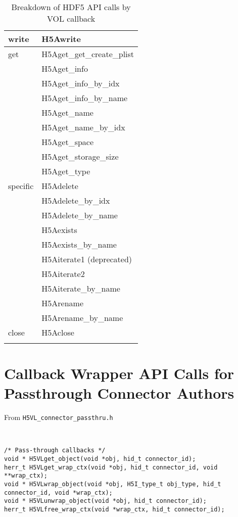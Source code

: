 \begin{appendices}
\begin{longtable}{ |l|>{\raggedright\arraybackslash}l| }
    \hline
    write & H5Awrite \\
    \hline
    get & H5Aget\_get\_create\_plist \\
        & H5Aget\_info \\
        & H5Aget\_info\_by\_idx \\
        & H5Aget\_info\_by\_name \\
        & H5Aget\_name \\
        & H5Aget\_name\_by\_idx \\
        & H5Aget\_space \\
        & H5Aget\_storage\_size \\
        & H5Aget\_type \\
    \hline
    specific & H5Adelete \\
             & H5Adelete\_by\_idx \\
             & H5Adelete\_by\_name \\
             & H5Aexists \\
             & H5Aexists\_by\_name \\
             & H5Aiterate1 (deprecated) \\
             & H5Aiterate2 \\
             & H5Aiterate\_by\_name \\
             & H5Arename \\
             & H5Arename\_by\_name \\
    \hline
    close & H5Aclose \\
    \hline
\caption{Breakdown of HDF5 API calls by VOL callback}
\end{longtable}

\pagebreak

\section{Callback Wrapper API Calls for Passthrough Connector Authors}
\label{sec:B}

From {\tt H5VL\_connector\_passthru.h}

\begin{lstlisting}


/* Pass-through callbacks */
void * H5VLget_object(void *obj, hid_t connector_id);
herr_t H5VLget_wrap_ctx(void *obj, hid_t connector_id, void **wrap_ctx);
void * H5VLwrap_object(void *obj, H5I_type_t obj_type, hid_t connector_id, void *wrap_ctx);
void * H5VLunwrap_object(void *obj, hid_t connector_id);
herr_t H5VLfree_wrap_ctx(void *wrap_ctx, hid_t connector_id);


\end{lstlisting}
\end{appendices}

